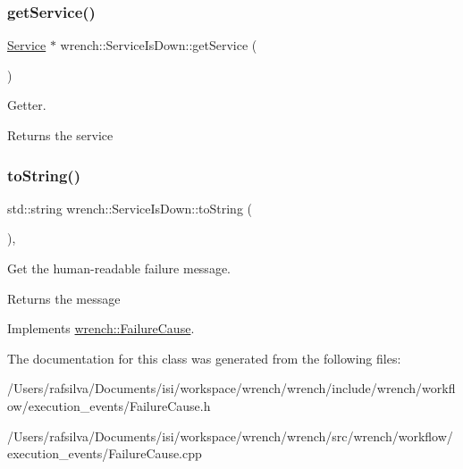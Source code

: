 \subsubsection{\texorpdfstring{get\+Service()}{getService()}}
{\footnotesize\ttfamily \hyperlink{classwrench_1_1_service}{Service} $\ast$ wrench\+::\+Service\+Is\+Down\+::get\+Service (\begin{DoxyParamCaption}{ }\end{DoxyParamCaption})}



Getter. 

\begin{DoxyReturn}{Returns}
the service 
\end{DoxyReturn}
\mbox{\label{classwrench_1_1_service_is_down_a29dbb2d3dd1b5d6a47536bab974b7151}} 
\subsubsection{\texorpdfstring{to\+String()}{toString()}}
{\footnotesize\ttfamily std\+::string wrench\+::\+Service\+Is\+Down\+::to\+String (\begin{DoxyParamCaption}{ }\end{DoxyParamCaption})\hspace{0.3cm}{\ttfamily [override]}, {\ttfamily [virtual]}}



Get the human-\/readable failure message. 

\begin{DoxyReturn}{Returns}
the message 
\end{DoxyReturn}


Implements \hyperlink{classwrench_1_1_failure_cause_afbad248ebe902409f2cd4f1d6f2b867d}{wrench\+::\+Failure\+Cause}.



The documentation for this class was generated from the following files\+:\begin{DoxyCompactItemize}
\item 
/\+Users/rafsilva/\+Documents/isi/workspace/wrench/wrench/include/wrench/workflow/execution\+\_\+events/Failure\+Cause.\+h\item 
/\+Users/rafsilva/\+Documents/isi/workspace/wrench/wrench/src/wrench/workflow/execution\+\_\+events/Failure\+Cause.\+cpp\end{DoxyCompactItemize}
